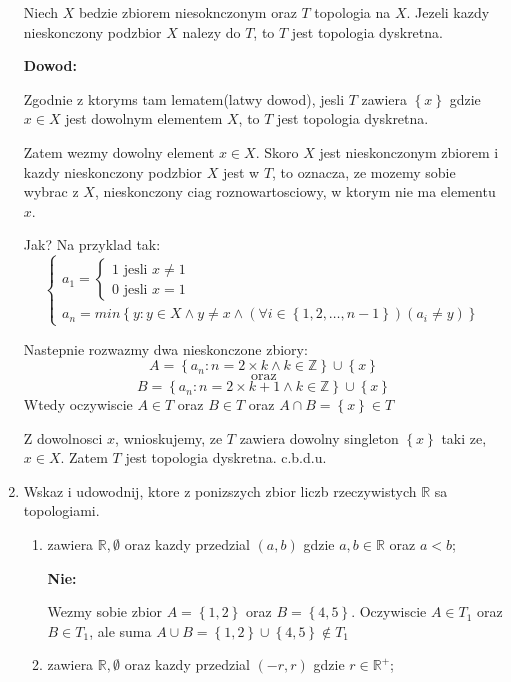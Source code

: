 \documentclass{article}
\begin{document}
\begin{enumerate}
\begin{tcolorbox}[colback=white!90!green,colframe=black!35!green,title=Lemat: Topologia dyskretna i podzbiory nieskonczone]
            Niech $X$ bedzie zbiorem niesoknczonym oraz $T$ topologia na $X$. Jezeli kazdy nieskonczony podzbior $X$ nalezy do $T$, to $T$ jest topologia dyskretna.

        \end{tcolorbox}
        \textbf{Dowod:}

        Zgodnie z ktoryms tam lematem(latwy dowod), jesli $T$ zawiera $\left\{x\right\}$ gdzie $x \in X$ jest dowolnym elementem $X$, to $T$ jest topologia dyskretna. 

        Zatem wezmy dowolny element $x \in X$. Skoro $X$ jest nieskonczonym zbiorem i kazdy nieskonczony podzbior $X$ jest w $T$, to oznacza, ze mozemy sobie wybrac z $X$, nieskonczony ciag roznowartosciowy, w ktorym nie ma elementu $x$. 

        Jak? Na przyklad tak:
        $$
        \begin{cases}
            a_{1} = \begin{cases} 1 \text{ jesli } x \neq 1 \\ 0 \text{ jesli } x = 1   \end{cases} \\
                a_{n} = min\left\{y: y \in X \land y \neq x \land (\forall i \in \left\{1,2,\dots,n-1\right\})(a_{i} \neq y)\right\}
        \end{cases}$$

        Nastepnie rozwazmy dwa nieskonczone zbiory:
        $$A = \left\{a_{n}: n = 2\times k \land k \in \mathbb{Z}\right\} \cup \left\{x\right\}$$
        $$\text{ oraz }$$ 
        $$B = \left\{a_{n}: n = 2\times k + 1\land k \in \mathbb{Z}\right\} \cup \left\{x\right\} $$
        Wtedy oczywiscie $A \in T$ oraz $B \in T$ oraz $A \cap B = \left\{x\right\} \in T$

        Z dowolnosci $x$, wnioskujemy, ze $T$ zawiera dowolny singleton $\left\{x\right\}$ taki ze, $x \in X$. Zatem $T$ jest topologia dyskretna. c.b.d.u. 

    \item Wskaz i udowodnij, ktore z ponizszych zbior liczb rzeczywistych $\mathbb{R}$ sa topologiami.

        \begin{enumerate}[label={$T_{\arabic*} :$}]
            \item zawiera $\mathbb{R}, \emptyset$ oraz kazdy przedzial $(a,b)$ gdzie $a,b \in \mathbb{R}$ oraz $a < b$;

                \textbf{Nie:}

                Wezmy sobie zbior $A = \left\{ 1,2 \right\}$ oraz $B = \left\{ 4,5 \right\}$. Oczywiscie $A \in T_{1}$ oraz $B \in T_{1}$, ale suma $A \cup B = \left\{ 1,2 \right\} \cup \left\{ 4,5 \right\} \notin T_{1}$
            \item zawiera $\mathbb{R}, \emptyset$ oraz kazdy przedzial $(-r,r)$ gdzie $r \in {\mathbb{R}}^{+}$;


\end{enumerate}
\end{enumerate}
\end{document}
